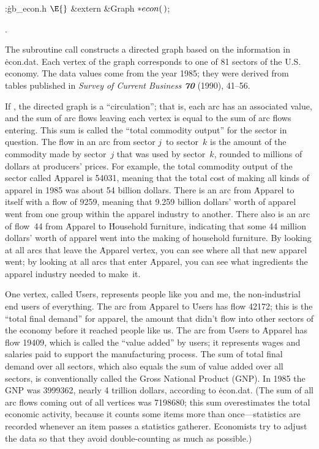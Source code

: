 \Y\B\4:\.{gb\_econ.h }\X${}\E{}$\6
\&{extern} \&{Graph} ${}{*}\\{econ}(\,){}$;\par
{}.\fi

The subroutine call 
constructs a directed graph based on the information in \.{econ.dat}.
Each vertex of the graph corresponds to one of 81 sectors of the U.S.
economy. The data values come from the year 1985; they were derived from
tables published in {\sl Survey of Current Business\/ \bf70} (1990), 41--56.

If , the directed graph is a
``circulation'';
that is, each arc has an associated  value, and
the sum of arc flows leaving each vertex is equal to the
sum of arc flows entering. This sum is called the ``total commodity output''
for the sector in question. The flow in an arc from sector $j$~to
sector~$k$ is the amount of the commodity made by sector~$j$ that was
used by sector~$k$, rounded to millions of dollars at producers' prices.
For example, the total commodity output of the sector called \.{Apparel}
is 54031, meaning that the total cost of making all kinds of apparel in
1985 was about 54 billion dollars. There is an arc from \.{Apparel} to
itself with a flow of 9259, meaning that 9.259 billion dollars' worth
of apparel went from one group within the apparel industry to another.
There also is an arc of flow~44 from \.{Apparel} to \.{Household}
\.{furniture}, indicating that some 44 million dollars' worth of apparel
went into the making of household furniture. By looking at all
arcs that leave the \.{Apparel} vertex, you can see where all that
new apparel went; by looking at all arcs that enter \.{Apparel}, you can
see what ingredients the apparel industry needed to make~it.

One vertex, called \.{Users}, represents people like you and me, the
non-industrial end users of everything. The arc from \.{Apparel} to
\.{Users} has flow 42172; this is the ``total final demand'' for
apparel, the amount that didn't flow into other sectors of the economy
before it reached people like us. The arc from \.{Users} to \.{Apparel}
has flow 19409, which is called the ``value added'' by users; it
represents wages and salaries paid to support the manufacturing
process. The sum of total final demand over all sectors, which also
equals the sum of value added over all sectors, is conventionally
called the Gross National Product (GNP). In 1985 the GNP was 3999362,
nearly 4 trillion dollars, according to \.{econ.dat}. (The sum of all
arc flows coming out of all vertices was 7198680; this sum
overestimates the total economic activity, because it counts some
items more than once---statistics are recorded whenever an item
passes a statistics gatherer. Economists try to adjust the data so that
they avoid double-counting as much as possible.)

